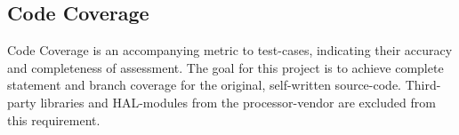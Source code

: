 	\subsection{Code Coverage}
	Code Coverage is an accompanying metric to test-cases, indicating their accuracy and completeness of assessment. The goal for this project is to achieve complete statement and branch coverage for the original, self-written source-code. Third-party libraries and HAL-modules from the processor-vendor are excluded from this requirement.
	